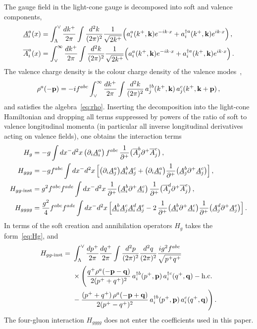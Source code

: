 The gauge field in the light-cone gauge is decomposed into soft and valence components,
\begin{align}
\underline{A}^a_i(x)&=\int_\Lambda^\vee\frac{dk^+}{2\pi}\int\frac{d^2k}{(2\pi)^2}\frac{1}{\sqrt{2k^+}}\Big(a^a_i(k^+,\mathbf{k})e^{-ik\cdot x}+a^{\dagger a}_i(k^+,\mathbf{k})e^{ik\cdot x}\Big)\,,\notag\\
\overline{A}^a_i(x)&=\int_\vee^\infty\frac{dk^+}{2\pi}\int\frac{d^2k}{(2\pi)^2}\frac{1}{\sqrt{2k^+}}\Big(a^a_i(k^+,\mathbf{k})e^{-ik\cdot x}+a^{\dagger a}_i(k^+,\mathbf{k})e^{ik\cdot x}\Big)\,.
\end{align}
The valence charge density is the colour charge density of the valence modes~\cite{Radhakrishnan:2026soft},
\begin{align}
\rho^a(-\mathbf{p})=-if^{abc}\int_\vee^\infty\frac{dk^+}{2\pi}\int\frac{d^2k}{(2\pi)^2}\,a^{\dagger b}_j(k^+,\mathbf{k})\,a^c_j(k^+,\mathbf{k}+\mathbf{p})\,,
\end{align}
and satisfies the algebra~\eqref{eq:rho}. Inserting the decomposition into the light-cone Hamiltonian and dropping all terms suppressed by powers of the ratio of soft to valence longitudinal momenta (in particular all inverse longitudinal derivatives acting on valence fields), one obtains the interaction terms~\cite{Lublinsky:2016meo,Radhakrishnan:2026soft}
\begin{align}
H_g&=-g\int dx^-d^2x\,\big(\partial_i\underline A^a_i\big)\,f^{abc}\,\frac{1}{\partial^+}\big(\overline A^b_j\partial^+\overline A^c_j\big)\,,\notag\\
H_{ggg}&=-gf^{abc}\int dx^-d^2x\,\Big[\big(\partial_i\underline A^a_j\big)\underline A^b_i\underline A^c_j+\big(\partial_i\underline A^a_i\big)\frac{1}{\partial^+}\big(\underline A^b_j\partial^+\underline A^c_j\big)\Big]\,,\notag\\
H_{gg\text{-inst}}&=g^2f^{abc}f^{ade}\int dx^-d^2x\,\frac{1}{\partial^+}\big(\underline A^b_i\partial^+\underline A^c_i\big)\,\frac{1}{\partial^+}\big(\overline A^d_j\partial^+\overline A^e_j\big)\,,\notag\\
H_{gggg}&=\frac{g^2}{4}f^{abc}f^{ade}\int dx^-d^2x\,\Big[\underline A^b_i\underline A^c_j\underline A^d_i\underline A^e_j-2\,\frac{1}{\partial^+}\big(\underline A^b_i\partial^+\underline A^c_i\big)\frac{1}{\partial^+}\big(\underline A^d_j\partial^+\underline A^e_j\big)\Big]\,.
\end{align}
In terms of the soft creation and annihilation operators $H_g$ takes the form~\eqref{eq:Hg}, and
\begin{align}
H_{gg\text{-inst}}=\ &\int_\Lambda^\vee\frac{dp^+}{2\pi}\frac{dq^+}{2\pi}\int\frac{d^2p}{(2\pi)^2}\frac{d^2q}{(2\pi)^2}\frac{ig^2f^{abc}}{\sqrt{p^+q^+}}\notag\\&\times\Bigg(\frac{q^+\rho^a(-\v p-\v q)}{2(p^++q^+)^2}\,a^{\dagger b}_i(p^+,\v p)\,a^{\dagger c}_i(q^+,\v q)-{\rm h.c.}
\notag\\&
-\frac{(p^++q^+)\,\rho^a(-\v p+\v q)}{2(p^+-q^+)^2}\,a^{\dagger b}_i(p^+,\v p)\,a^c_i(q^+,\v q)\Bigg)\,.
\end{align}
The four-gluon interaction $H_{gggg}$ does not enter the coefficients used in this paper.

